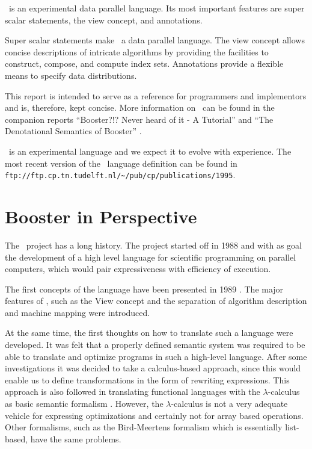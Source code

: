 \Booster\ is an experimental data parallel language. Its most
important features are super scalar statements, the view concept, and
annotations.

Super scalar statements make \Booster\ a data parallel language. The
view concept allows concise descriptions of intricate algorithms by
providing the facilities to construct, compose, and compute index
sets. Annotations provide a flexible means to specify data
distributions.

This report is intended to serve as a reference for programmers and
implementors and is, therefore, kept concise. More information on
\Booster\ can be found in the companion reports ``Booster?!? Never
heard of it - A Tutorial'' \cite{Dechering95} and ``The Denotational
Semantics of Booster'' \cite{Dechering95a}.

\Booster\ is an experimental language and we expect it to evolve with
experience. The most recent version of the \Booster\ language
definition can be found in
\verb'ftp://ftp.cp.tn.tudelft.nl/~/pub/cp/publications/1995'.

\section*{Booster in Perspective}

The \Booster\ project has a long history. The project started off in
1988 and with as goal the development of a high level language for
scientific programming on parallel computers, which would pair
expressiveness with efficiency of execution.

The first concepts of the language have been presented in 1989
\cite{Paalvast89} \cite{Paalvast89a}. The major features of \Booster,
such as the View concept and the separation of algorithm description
and machine mapping were introduced.

At the same time, the first thoughts on how to translate such a
language were developed. It was felt that a properly defined semantic
system was required to be able to translate and optimize programs in
such a high-level language. After some investigations it was decided
to take a calculus-based approach, since this would enable us to
define transformations in the form of rewriting expressions. This
approach is also followed in translating functional languages with the
$\lambda$-calculus as basic semantic formalism \cite{Jones87}.
However, the $\lambda$-calculus is not a very adequate vehicle for
expressing optimizations \cite{Plasmeijer93} and certainly not for
array based operations.  Other formalisms, such as the Bird-Meertens
formalism \cite{Bird89} which is essentially list-based, have the same
problems.

